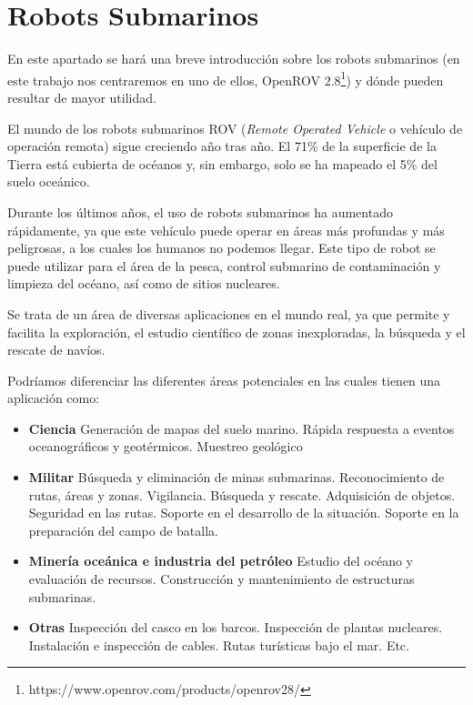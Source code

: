 \section{Robots Submarinos}
\label{cap:Robots Submarinos}
En este apartado se hará una breve introducción sobre los robots submarinos (en este trabajo nos centraremos en uno de ellos, OpenROV 2.8\footnote{https://www.openrov.com/products/openrov28/}) y dónde pueden resultar de mayor utilidad.

El mundo de los robots submarinos ROV (\textit{Remote Operated Vehicle} o vehículo de operación remota) sigue creciendo año tras año. El 71\% de la superficie de la Tierra está cubierta de océanos y, sin embargo, solo se ha mapeado el 5\% del suelo oceánico.

Durante los últimos años, el uso de robots submarinos ha aumentado rápidamente, ya que este vehículo puede operar en áreas más profundas y más peligrosas, a los cuales los humanos no podemos llegar. Este tipo de robot se puede utilizar para el área de la pesca, control submarino de contaminación y limpieza del océano, así como de sitios nucleares.

Se trata de un área de diversas aplicaciones en el mundo real, ya que permite y facilita la exploración, el estudio científico de zonas inexploradas, la búsqueda y el rescate de navíos.

Podríamos diferenciar las diferentes áreas potenciales en las cuales tienen una aplicación como:

  \begin{itemize}
  \item \textbf{Ciencia}
    \subitem Generación de mapas del suelo marino.
    \subitem Rápida respuesta a eventos oceanográficos y geotérmicos.
    \subitem Muestreo geológico
  \item \textbf{Militar}
   \subitem Búsqueda y eliminación de minas submarinas. 
   \subitem Reconocimiento de rutas, áreas y zonas. 
   \subitem Vigilancia. 
   \subitem Búsqueda y rescate. 
   \subitem Adquisición de objetos. 
   \subitem Seguridad en las rutas. 
   \subitem Soporte en el desarrollo de la situación. 
   \subitem Soporte en la preparación del campo de batalla. 
  \item \textbf{Minería oceánica e industria del petróleo}
    \subitem Estudio del océano y evaluación de recursos.
    \subitem Construcción y mantenimiento de estructuras submarinas.
  \item \textbf{Otras}
    \subitem Inspección del casco en los barcos.
    \subitem Inspección de plantas nucleares.
    \subitem Instalación e inspección de cables. 
    \subitem Rutas turísticas bajo el mar.
    \subitem Etc.
 \end{itemize}


